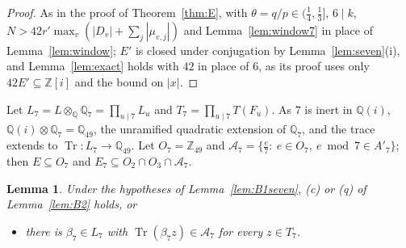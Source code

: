 \documentclass[11pt,a4paper]{amsart}
\newtheorem{lemma}{Lemma}
\theoremstyle{remark}
\newcommand{\Q}{\mathbb{Q}}
\newcommand{\Z}{\mathbb{Z}}
\newcommand{\Tr}{\operatorname{Tr}}
\newcommand{\cA}{\mathcal{A}}
\begin{document}
\begin{proof}
As in the proof of Theorem~\ref{thm:E}, with $\theta=q/p\in(\frac14,\frac13]$, $6\mid k$,
$N>42r'\max_v(|D_v|+\sum_j|\mu_{v,j}|)$ and Lemma~\ref{lem:window7} in place of Lemma~\ref{lem:window}; $E'$ is closed
under conjugation by Lemma~\ref{lem:seven}(i), and Lemma~\ref{lem:exact} holds with $42$ in place of $6$, as its proof
uses only $42E'\subseteq\Z[i]$ and the bound on $|x|$.
\end{proof}

Let $L_7=L\otimes_\Q\Q_7=\prod_{u\mid7}L_u$ and $T_7=\prod_{u\mid7}T(F_u)$. As $7$ is inert in $\Q(i)$,
$\Q(i)\otimes\Q_7=\Q_{49}$, the unramified quadratic extension of $\Q_7$, and the trace extends to
$\Tr:L_7\to\Q_{49}$. Let $O_7=\Z_{49}$ and $\cA_7=\{\frac e7:\ e\in O_7,\ e\bmod7\in A'_7\}$; then $E\subseteq O_7$ and
$E_7\subseteq O_2\cap O_3\cap\cA_7$.

\begin{lemma}\label{lem:B2seven}
Under the hypotheses of Lemma~\ref{lem:B1seven}, \textup{(c)} or \textup{(q)} of Lemma~\ref{lem:B2} holds, or
\begin{itemize}
\item[(7$'$)] there is $\beta_7\in L_7$ with $\Tr(\beta_7z)\in\cA_7$ for every $z\in T_7$.
\end{itemize}
\end{lemma}
\end{document}
